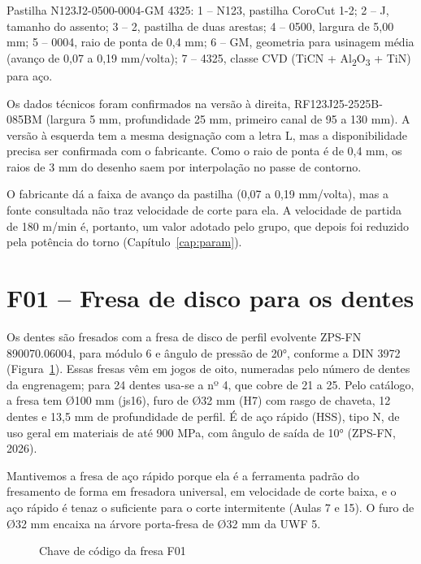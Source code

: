 \noindent Pastilha N123J2-0500-0004-GM 4325: 1 – N123, pastilha CoroCut 1-2; 2 – J, tamanho do assento; 3 – 2, pastilha de duas arestas; 4 – 0500, largura de 5,00 mm; 5 – 0004, raio de ponta de 0,4 mm; 6 – GM, geometria para usinagem média (avanço de 0,07 a 0,19 mm/volta); 7 – 4325, classe CVD (TiCN + Al\textsubscript{2}O\textsubscript{3} + TiN) para aço.

Os dados técnicos foram confirmados na versão à direita, RF123J25-2525B-085BM (largura 5 mm, profundidade 25 mm, primeiro canal de 95 a 130 mm). A versão à esquerda tem a mesma designação com a letra L, mas a disponibilidade precisa ser confirmada com o fabricante. Como o raio de ponta é de 0,4 mm, os raios de 3 mm do desenho saem por interpolação no passe de contorno.

O fabricante dá a faixa de avanço da pastilha (0,07 a 0,19 mm/volta), mas a fonte consultada não traz velocidade de corte para ela. A velocidade de partida de 180 m/min é, portanto, um valor adotado pelo grupo, que depois foi reduzido pela potência do torno (Capítulo~\ref{cap:param}).

\section{F01 – Fresa de disco para os dentes}\label{sec:F01}

Os dentes são fresados com a fresa de disco de perfil evolvente ZPS-FN 890070.06004, para módulo 6 e ângulo de pressão de 20°, conforme a DIN 3972 (Figura~\ref{fig:chaveF01}). Essas fresas vêm em jogos de oito, numeradas pelo número de dentes da engrenagem; para 24 dentes usa-se a nº 4, que cobre de 21 a 25. Pelo catálogo, a fresa tem Ø100 mm (js16), furo de Ø32 mm (H7) com rasgo de chaveta, 12 dentes e 13,5 mm de profundidade de perfil. É de aço rápido (HSS), tipo N, de uso geral em materiais de até 900 MPa, com ângulo de saída de 10° (ZPS-FN, 2026).

Mantivemos a fresa de aço rápido porque ela é a ferramenta padrão do fresamento de forma em fresadora universal, em velocidade de corte baixa, e o aço rápido é tenaz o suficiente para o corte intermitente (Aulas 7 e 15). O furo de Ø32 mm encaixa na árvore porta-fresa de Ø32 mm da UWF 5.

\begin{figure}[H]
\centering
\caption{Chave de código da fresa F01}\label{fig:chaveF01}
\end{figure}

